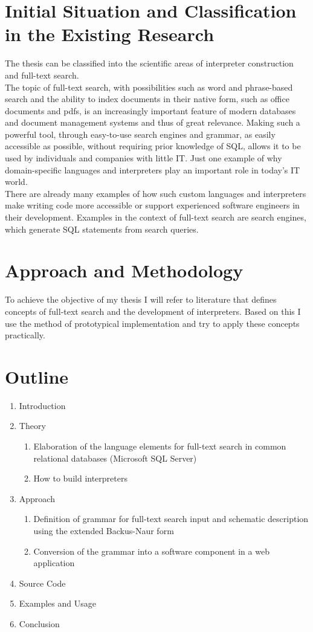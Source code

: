 \section{Initial Situation and Classification in the Existing Research}
The thesis can be classified into the scientific areas of interpreter construction and full-text search.\\
The topic of full-text search, with possibilities such as word and phrase-based search and the ability to index documents in their native form, such as office documents and pdfs, is an increasingly important feature of modern databases and document management systems and thus of great relevance. Making such a powerful tool, through easy-to-use search engines and grammar, as easily accessible as possible, without requiring prior knowledge of SQL, allows it to be used by individuals and companies with little IT. Just one example of why domain-specific languages and interpreters play an important role in today's IT world.\\
There are already many examples of how such custom languages and interpreters make writing code more accessible or support experienced software engineers in their development. Examples in the context of full-text search are search engines, which generate SQL statements from search queries.
\section{Approach and Methodology}
To achieve the objective of my thesis I will refer to literature that defines concepts of full-text search and the development of interpreters. Based on this I use the method of prototypical implementation and try to apply these concepts practically.
\section{Outline}
\begin{enumerate}
    \item Introduction
    \item Theory
    \begin{enumerate}
        \item Elaboration of the language elements for full-text search in common relational databases (Microsoft SQL Server)
        \item How to build interpreters
    \end{enumerate}
    \item Approach
    \begin{enumerate}
        \item Definition of grammar for full-text search input and schematic description using the extended Backus-Naur form
        \item Conversion of the grammar into a software component in a web application
    \end{enumerate}
    \item Source Code
    \item Examples and Usage
    \item Conclusion
\end{enumerate}